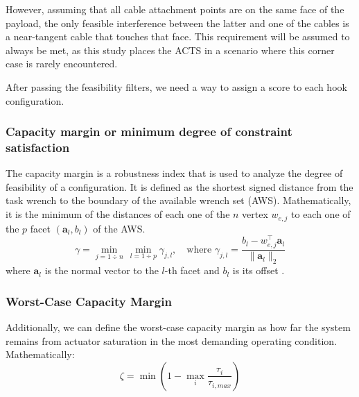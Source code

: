 However, assuming that all cable attachment points are on the same face of the payload, the only feasible interference between the latter and one of the cables is a near-tangent cable that touches that face. This requirement will be assumed to always be met, as this study places the ACTS in a scenario where this corner case is rarely encountered.

After passing the feasibility filters, we need a way to assign a score to each hook configuration.

\subsubsection{Capacity margin or minimum degree of constraint satisfaction}
The capacity margin is a robustness index that is used to analyze the degree of feasibility of a configuration. It is defined as the shortest signed distance from the task wrench to the boundary of the available wrench set (AWS). Mathematically, it is the minimum of the distances of each one of the $n$ vertex $w_{e, j}$ to each one of the $p$ facet $\left( \mathbf{a}_l, b_l\right)$ of the AWS.
\begin{equation}
    \gamma = \min_{j = 1 \div n} \, \min_{l = 1\div p} \gamma_{j, l}, \quad \text{where } \gamma_{j, l} = \frac{b_l - w_{e, j}^\top \mathbf{a}_l}{\|\mathbf{a}_l\|_2}
\end{equation}
where $\mathbf{a}_l$ is the normal vector to the $l$-th facet and $b_l$ is its offset \cite{pott_arachnis_2015}.

\subsubsection{Worst-Case Capacity Margin}
Additionally, we can define the worst-case capacity margin as how far the system remains from actuator saturation in the most demanding operating condition. Mathematically:
\begin{equation}
    \zeta = \min \left(1 - \max_i \frac{\tau_i}{\tau_{i, max}} \right)
\end{equation}

